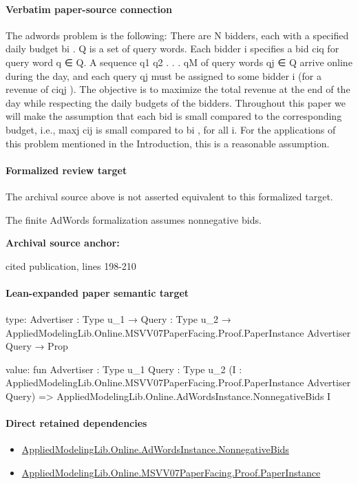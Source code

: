 \documentclass[10pt]{article}
\begin{document}
\paragraph{Verbatim paper-source connection}
\begin{ReviewVerbatim}
The adwords problem is the following: There are N bidders, each with a specified daily budget
bi . Q is a set of query words. Each bidder i specifies a bid ciq for query word q ∈ Q. A
sequence q1 q2 . . . qM of query words qj ∈ Q arrive online during the day, and each query qj
must be assigned to some bidder i (for a revenue of ciqj ). The objective is to maximize the
total revenue at the end of the day while respecting the daily budgets of the bidders.
Throughout this paper we will make the assumption that each bid is small compared to the
corresponding budget, i.e., maxj cij is small compared to bi , for all i. For the applications of
this problem mentioned in the Introduction, this is a reasonable assumption.
\end{ReviewVerbatim}


\paragraph{Formalized review target}
The archival source above is not asserted equivalent to this formalized target.
\begin{ReviewVerbatim}
The finite AdWords formalization assumes nonnegative bids.
\end{ReviewVerbatim}

\textbf{Archival source anchor:} {\footnotesize\raggedright cited publication, lines 198-\allowbreak{}210\par}
\paragraph{Lean-expanded paper semantic target}
\begin{ReviewVerbatim}
type:
{Advertiser : Type u_1} →
  {Query : Type u_2} → AppliedModelingLib.Online.MSVV07PaperFacing.Proof.PaperInstance Advertiser Query → Prop

value:
fun {Advertiser : Type u_1} {Query : Type u_2}
    (I : AppliedModelingLib.Online.MSVV07PaperFacing.Proof.PaperInstance Advertiser Query) =>
  AppliedModelingLib.Online.AdWordsInstance.NonnegativeBids I
\end{ReviewVerbatim}

\paragraph{Direct retained dependencies}
\begin{itemize}\raggedright
\item \hyperlink{governing-declaration-7bed8c5ff5e5cde7}{Applied\allowbreak{}Modeling\allowbreak{}Lib.\allowbreak{}Online.\allowbreak{}Ad\allowbreak{}Words\allowbreak{}Instance.\allowbreak{}Nonnegative\allowbreak{}Bids}
\item \hyperlink{governing-declaration-3117431b6d1253dc}{Applied\allowbreak{}Modeling\allowbreak{}Lib.\allowbreak{}Online.\allowbreak{}MSVV07\allowbreak{}Paper\allowbreak{}Facing.\allowbreak{}Proof.\allowbreak{}Paper\allowbreak{}Instance}
\end{itemize}
\end{document}
